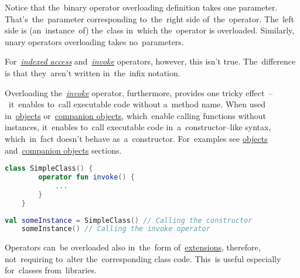 \noindent Notice that the~binary operator overloading definition takes one parameter.
That's~the~parameter corresponding to~the~right side of~the~operator.
The~left side is (an~instance~of) the~class in~which the~operator is overloaded.
Similarly, unary operators overloading takes no~parameters.

For~\hyperref[kotlinindexedaccess]{\textit{indexed access}} \mbox{and \hyperref[kotlininvoke]{\textit{invoke}}} operators, however, this isn't true.
The~difference is that they~aren't written in~the~infix notation.

\label{kotlininvokeoverload}
Overloading the~\hyperref[kotlininvoke]{\textit{invoke}} operator, furthermore, provides one tricky effect~--~it~enables to~call executable code without a~method name.
When used in~\hyperref[kotlinobject]{objects} or~\hyperref[kotlincompanionobject]{companion objects}, which~enable calling functions without instances, it~enables to~call executable code in~a~constructor--like syntax, which~in~fact doesn't behave as~a~constructor.
For~examples see \hyperref[kotlinobject]{objects} and~\hyperref[kotlincompanionobject]{companion objects} sections.
\newpage

\begin{lstlisting}[language=Kotlin, title={Custom class with \textit{invoke} operator overloading}]
    class SimpleClass() {
        operator fun invoke() {
            ...
        }
    }
\end{lstlisting}
\begin{lstlisting}[language=Kotlin, title={Usage -- no conflict with constructor}]
    val someInstance = SimpleClass() // Calling the constructor
    someInstance() // Calling the invoke operator
\end{lstlisting}

\note Operators can~be overloaded also in~the~form of~\hyperref[kotlinextensions]{extensions}, therefore, not~requiring to~alter the~corresponding class code.
This~is useful especially for~classes from~libraries.
